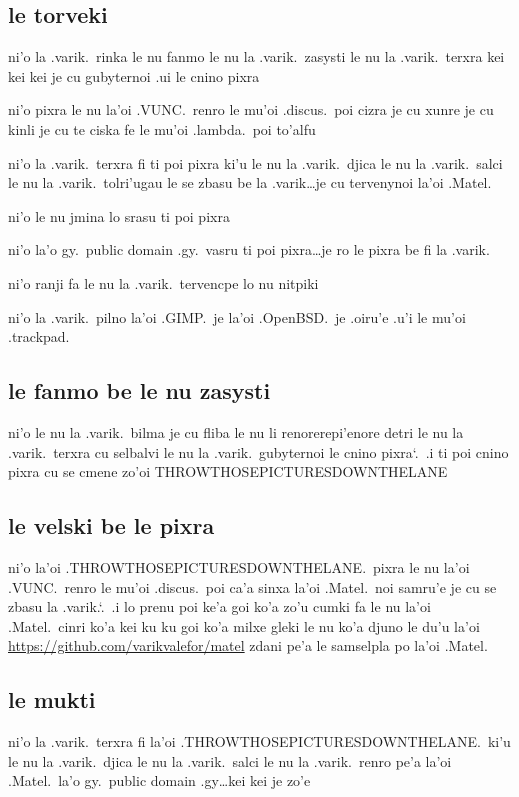 \documentclass{report}
\newcommand\sds{\spacefactor\sfcode`.\ \space}
\begin{document}
\subsection{le torveki}
ni'o la .varik.\ rinka le nu fanmo le nu la .varik.\ zasysti le nu la .varik.\ terxra kei kei kei je cu gubyternoi .ui le cnino pixra

ni'o pixra le nu la'oi .VUNC.\ renro le mu'oi .discus.\ poi cizra je cu xunre je cu kinli je cu te ciska fe le mu'oi .lambda.\ poi to'alfu

ni'o la .varik.\ terxra fi ti poi pixra ki'u le nu la .varik.\ djica le nu la .varik.\ salci le nu la .varik.\ tolri'ugau le se zbasu be la .varik\ldots je cu tervenynoi la'oi .Matel.

ni'o le nu jmina lo srasu ti poi pixra

ni'o la'o gy.\ public domain .gy.\ vasru ti poi pixra\ldots je ro le pixra be fi la .varik.

ni'o ranji fa le nu la .varik.\ tervencpe lo nu nitpiki

ni'o la .varik.\ pilno la'oi .GIMP.\ je la'oi .OpenBSD.\ je .oiru'e .u'i le mu'oi .trackpad.

\subsection{le fanmo be le nu zasysti}
ni'o le nu la .varik.\ bilma je cu fliba le nu li renorerepi'enore detri le nu la .varik.\ terxra cu selbalvi le nu la .varik.\ gubyternoi le cnino pixra\sds  .i ti poi cnino pixra cu se cmene zo'oi THROWTHOSEPICTURESDOWNTHELANE

\subsection{le velski be le pixra}
ni'o la'oi .THROWTHOSEPICTURESDOWNTHELANE.\ pixra le nu la'oi \linebreak  %
.VUNC.\ renro le mu'oi .discus.\ poi ca'a sinxa la'oi .Matel.\ noi samru'e je cu se zbasu la .varik.\sds  .i lo prenu poi ke'a goi ko'a zo'u cumki fa le nu la'oi .Matel.\ cinri ko'a kei ku ku goi ko'a milxe gleki le nu ko'a djuno le du'u la'oi \url{https://github.com/varikvalefor/matel} zdani pe'a le samselpla po la'oi .Matel.

\subsection{le mukti}
ni'o la .varik.\ terxra fi la'oi .THROWTHOSEPICTURESDOWNTHELANE.\ ki'u le nu la .varik.\ djica le nu la .varik.\ salci le nu la .varik.\ renro pe'a la'oi .Matel.\ la'o gy.\ public domain .gy\ldots kei kei je zo'e
\end{document}

